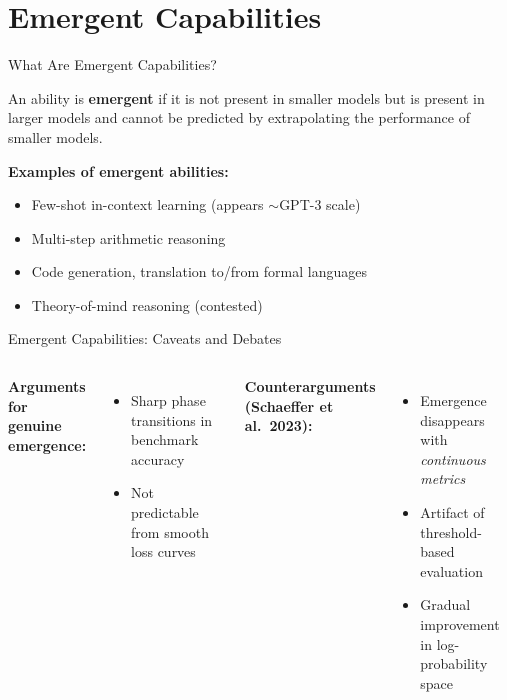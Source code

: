 \documentclass[aspectratio=169,10pt]{beamer}
\begin{document}
\section{Emergent Capabilities}


\begin{frame}{What Are Emergent Capabilities?}
  \begin{tcolorbox}[hitbox, title=Definition (Wei et al.\ 2022~\cite{wei2022emergent})]
    An ability is \textbf{emergent} if it is not present in smaller models but is present in larger models
    and cannot be predicted by extrapolating the performance of smaller models.
  \end{tcolorbox}
  \vspace{0.4em}
  \textbf{Examples of emergent abilities:}
  \begin{itemize}
    \item Few-shot in-context learning (appears $\sim$GPT-3 scale)
    \item Multi-step arithmetic reasoning
    \item Code generation, translation to/from formal languages
    \item Theory-of-mind reasoning (contested)
  \end{itemize}
\end{frame}

\begin{frame}{Emergent Capabilities: Caveats and Debates}
  \begin{columns}[T]
      \textbf{Arguments for genuine emergence:}
      \begin{itemize}
        \item Sharp phase transitions in benchmark accuracy
        \item Not predictable from smooth loss curves
      \end{itemize}
      \vspace{0.5em}
      \textbf{Counterarguments (Schaeffer et al.\ 2023):}
      \begin{itemize}
        \item Emergence disappears with \emph{continuous metrics}
        \item Artifact of threshold-based evaluation
        \item Gradual improvement in log-probability space
      \end{itemize}
  \end{columns}
\end{frame}
\end{document}
